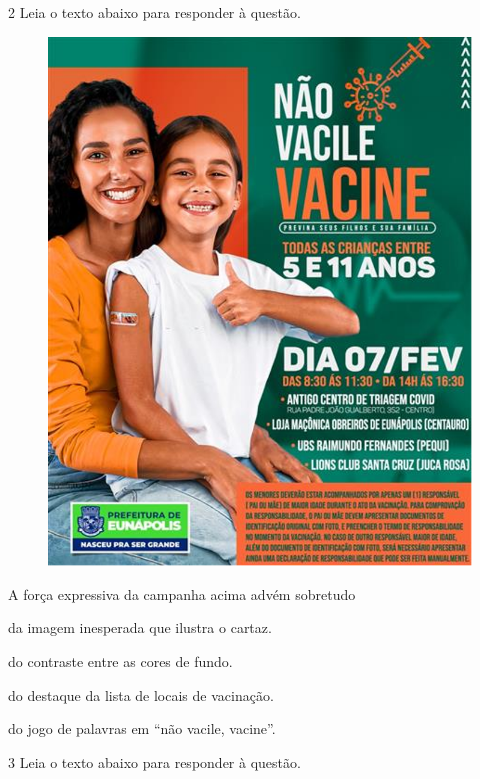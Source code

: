 \pagebreak

\num{2} Leia o texto abaixo para responder à questão. 

\begin{figure}[H]
\centering\includegraphics[width=.5\textwidth]{imgSAEB_7_POR/media/image24.png}
\end{figure}

A força expressiva da campanha acima advém sobretudo 

\begin{escolha}
    
    \item da imagem inesperada que ilustra o cartaz.
    
    \item do contraste entre as cores de fundo. 
    
    \item do destaque da lista de locais de vacinação. 
    
    \item do jogo de palavras em ``não vacile, vacine''.

\end{escolha}

\num{3} Leia o texto abaixo para responder à questão. 


